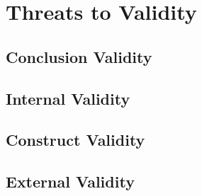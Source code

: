 \section{Threats to Validity}

\subsection{Conclusion Validity}

\subsection{Internal Validity}

\subsection{Construct Validity}

\subsection{External Validity}
